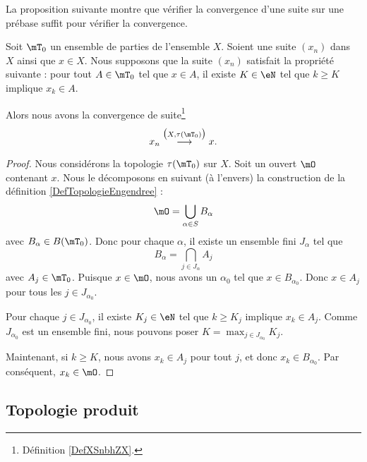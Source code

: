 La proposition suivante montre que vérifier la convergence d'une suite sur une prébase suffit pour vérifier la convergence.
\begin{proposition}     \label{PROPooJTJBooNtczsO}
	Soit \( \mT_0\) un ensemble de parties de l'ensemble \( X\). Soient une suite \( (x_n)\) dans \( X\) ainsi que \( x\in X\). Nous supposons que la suite \( (x_n)\) satisfait la propriété suivante : pour tout \( A\in \mT_0\) tel que \( x\in A\), il existe \( K\in \eN\) tel que \( k\geq K\) implique \( x_k\in A\).

	Alors nous avons la convergence de suite\footnote{Définition \ref{DefXSnbhZX}.}
	\begin{equation}
		x_n\stackrel{\big( X,\tau(\mT_0) \big)}{\longrightarrow}x.
	\end{equation}
\end{proposition}

\begin{proof}
	Nous considérons la topologie \( \tau(\mT_0)\) sur \( X\). Soit un ouvert \( \mO\) contenant \( x\). Nous le décomposons en suivant (à l'envers) la construction de la définition \ref{DefTopologieEngendree} :
	\begin{equation}
		\mO=\bigcup_{\alpha\in S}B_{\alpha}
	\end{equation}
	avec \( B_{\alpha}\in B(\mT_0)\). Donc pour chaque \( \alpha\), il existe un ensemble fini \( J_{\alpha}\) tel que
	\begin{equation}
		B_{\alpha}=\bigcap_{j\in J_{\alpha}}A_j
	\end{equation}
	avec \( A_j\in \mT_0\). Puisque \( x\in \mO\), nous avons un \( \alpha_0\) tel que \( x\in B_{\alpha_0}\). Donc \( x\in A_j\) pour tous les \( j\in J_{\alpha_0}\).

	Pour chaque \( j\in J_{\alpha_0}\), il existe \( K_j\in \eN\) tel que \( k\geq K_j\) implique \( x_k\in A_j\). Comme \( J_{\alpha_0}\) est un ensemble fini, nous pouvons poser \( K=\max_{j\in J_{\alpha_0}}K_j\).

	Maintenant, si \( k\geq K\), nous avons \( x_k\in A_j\) pour tout \( j\), et donc \( x_k\in B_{\alpha_0}\). Par conséquent, \( x_k\in \mO\).
\end{proof}


\subsection{Topologie produit}

